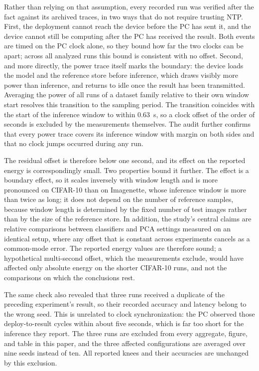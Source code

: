 \documentclass[sigconf,review,nonacm]{acmart}
\begin{document}
Rather than relying on that assumption, every recorded run was verified after the fact against its archived traces, in two ways that do not require trusting NTP. First, the deployment cannot reach the device before the PC has sent it, and the device cannot still be computing after the PC has received the result. Both events are timed on the PC clock alone, so they bound how far the two clocks can be apart; across all analyzed runs this bound is consistent with no offset. Second, and more directly, the power trace itself marks the boundary: the device loads the model and the reference store before inference, which draws visibly more power than inference, and returns to idle once the result has been transmitted. Averaging the power of all runs of a dataset family relative to their own window start resolves this transition to the sampling period. The transition coincides with the start of the inference window to within 0.63~s, so a clock offset of the order of seconds is excluded by the measurements themselves. The audit further confirms that every power trace covers its inference window with margin on both sides and that no clock jumps occurred during any run.

The residual offset is therefore below one second, and its effect on the reported energy is correspondingly small. Two properties bound it further. The effect is a boundary effect, so it scales inversely with window length and is more pronounced on CIFAR-10 than on Imagenette, whose inference window is more than twice as long; it does not depend on the number of reference samples, because window length is determined by the fixed number of test images rather than by the size of the reference store. In addition, the study's central claims are relative comparisons between classifiers and PCA settings measured on an identical setup, where any offset that is constant across experiments cancels as a common-mode error. The reported energy values are therefore sound; a hypothetical multi-second offset, which the measurements exclude, would have affected only absolute energy on the shorter CIFAR-10 runs, and not the comparisons on which the conclusions rest.

The same check also revealed that three runs received a duplicate of the preceding experiment's result, so their recorded accuracy and latency belong to the wrong seed. This is unrelated to clock synchronization: the PC observed those deploy-to-result cycles within about five seconds, which is far too short for the inference they report. The three runs are excluded from every aggregate, figure, and table in this paper, and the three affected configurations are averaged over nine seeds instead of ten. All reported knees and their accuracies are unchanged by this exclusion.
\end{document}
